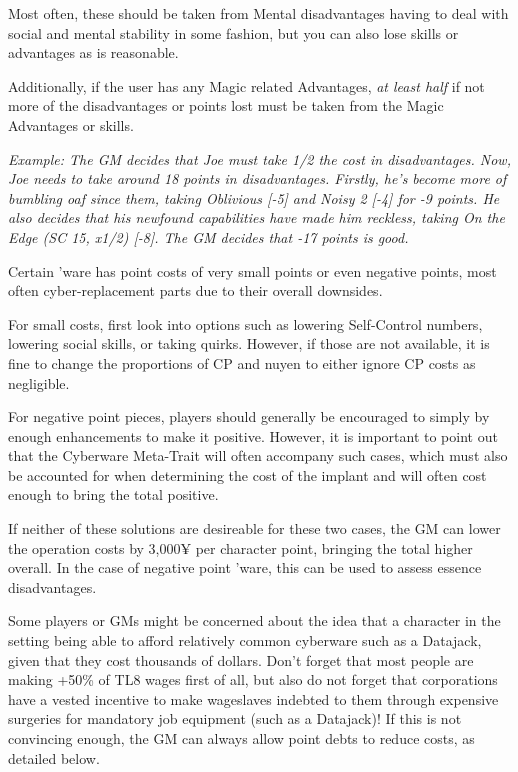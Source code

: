\begin{multicols*}{3}
	Most often, these should be taken from Mental disadvantages having to deal with social and mental stability in some fashion, but you can also lose skills or advantages as is reasonable.
	
	Additionally, if the user has any Magic related Advantages, \textit{at least half} if not more of the disadvantages or points lost must be taken from the Magic Advantages or skills.
	
	\textit{\textcolor{OliveGreen}{Example: The GM decides that Joe must take 1/2 the cost in disadvantages. Now, Joe needs to take around 18 points in disadvantages. Firstly, he's become more of bumbling oaf since them, taking Oblivious [-5] and Noisy 2 [-4] for -9 points. He also decides that his newfound capabilities have made him reckless, taking On the Edge (SC 15, x1/2) [-8]. The GM decides that -17 points is good.}}
	
	
	
	\begin{wrapfigure}[12]{l}{85pt}
		
	\end{wrapfigure}
	
	Certain 'ware has point costs of very small points or even negative points, most often cyber-replacement parts due to their overall downsides. 
	
	For small costs, first look into options such as lowering Self-Control numbers, lowering social skills, or taking quirks. However, if those are not available, it is fine to change the proportions of CP and nuyen to either ignore CP costs as negligible.
	
	For negative point pieces, players should generally be encouraged to simply by enough enhancements to make it positive. However, it is important to point out that the Cyberware Meta-Trait will often accompany such cases, which must also be accounted for when determining the cost of the implant and will often cost enough to bring the total positive.
	
	If neither of these solutions are desireable for these two cases, the GM can lower the operation costs by 3,000¥ per character point, bringing the total higher overall. In the case of negative point 'ware, this can be used to assess essence disadvantages.
	
	Some players or GMs might be concerned about the idea that a character in the setting being able to afford relatively common cyberware such as a Datajack, given that they cost thousands of dollars. Don't forget that most people are making +50\% of TL8 wages first of all, but also do not forget that corporations have a vested incentive to make wageslaves indebted to them through expensive surgeries for mandatory job equipment (such as a Datajack)! If this is not convincing enough, the GM can always allow point debts to reduce costs, as detailed below.
	

\end{multicols*}
